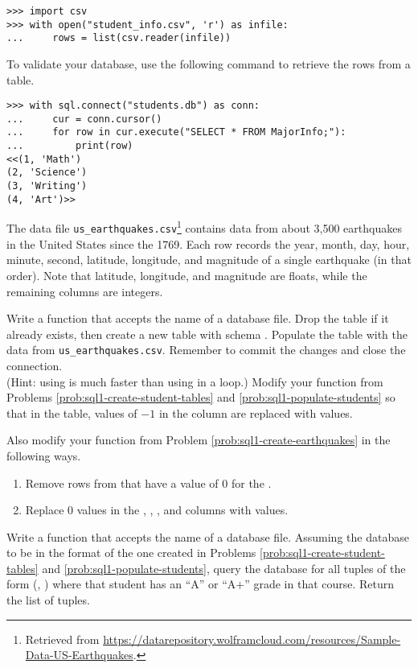 \begin{lstlisting}
>>> import csv
>>> with open("student_info.csv", 'r') as infile:
...     rows = list(csv.reader(infile))
\end{lstlisting}

To validate your database, use the following command to retrieve the rows from a table.

\begin{lstlisting}
>>> with sql.connect("students.db") as conn:
...     cur = conn.cursor()
...     for row in cur.execute("SELECT * FROM MajorInfo;"):
...         print(row)
<<(1, 'Math')
(2, 'Science')
(3, 'Writing')
(4, 'Art')>>
\end{lstlisting}
\label{prob:sql1-populate-students}

The data file \texttt{us\_earthquakes.csv}\footnote{Retrieved from \url{https://datarepository.wolframcloud.com/resources/Sample-Data-US-Earthquakes}.} contains data from about 3,500 earthquakes in the United States since the 1769.
Each row records the year, month, day, hour, minute, second, latitude, longitude, and magnitude of a single earthquake (in that order).
Note that latitude, longitude, and magnitude are floats, while the remaining columns are integers.

Write a function that accepts the name of a database file.
Drop the table  if it already exists, then create a new  table with schema .
Populate the table with the data from \texttt{us\_earthquakes.csv}.
Remember to commit the changes and close the connection.
\\ (Hint: using  is much faster than using  in a loop.)
\label{prob:sql1-create-earthquakes}
Modify your function from Problems \ref{prob:sql1-create-student-tables} and \ref{prob:sql1-populate-students} so that in the  table, values of $-1$ in the  column are replaced with  values.

Also modify your function from Problem \ref{prob:sql1-create-earthquakes} in the following ways.
\begin{enumerate}
    \item Remove rows from  that have a value of $0$ for the .
    \item Replace $0$ values in the , , , and  columns with  values.
\end{enumerate}
Write a function that accepts the name of a database file.
Assuming the database to be in the format of the one created in Problems \ref{prob:sql1-create-student-tables} and \ref{prob:sql1-populate-students}, query the database for all tuples of the form (, ) where that student has an ``A'' or ``A+'' grade in that course.
Return the list of tuples.

